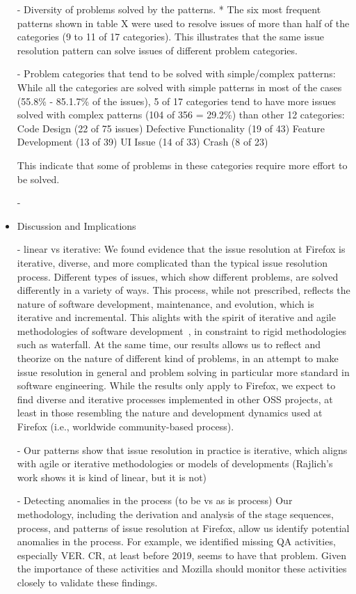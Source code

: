 \begin{itemize}
		- Diversity of problems solved by the patterns.
		  * The six most frequent patterns shown in table X were used to resolve issues of more than half of the categories  (9 to 11 of 17 categories). This illustrates that the same issue resolution pattern can solve issues of different problem categories. 
		
		- Problem categories that tend to be solved with simple/complex patterns:
		While all the categories are solved with simple patterns in most of the cases (55.8\% -  85.1.7\% of the issues), 5 of 17 categories tend to have more issues solved with complex patterns (104 of 356 = 29.2\%) than other 12 categories: 
		Code Design (22 of 75 issues)
		Defective Functionality (19 of 43)
		Feature Development (13 of 39)
		UI Issue (14 of 33)
		Crash (8 of 23)
		
		This indicate that some of problems in these categories require more effort to be solved.
		
		- 
		
	\item Discussion and Implications
	
	- linear vs iterative: 
			We found evidence that the issue resolution at Firefox is iterative, diverse, and more complicated than the typical issue resolution process. Different types of issues, which show different problems, are solved differently in a variety of ways. This process, while not prescribed, reflects the nature of software development, maintenance, and evolution, which is iterative and incremental. This alights with the spirit of iterative and agile methodologies of software development~\re, in constraint to rigid methodologies such as waterfall. At the same time, our results allows us to reflect and theorize on the nature of different kind of problems, in an attempt to make issue resolution in general and problem solving in particular more standard in software engineering. While the results only apply to Firefox, we expect to find diverse and iterative processes implemented in other OSS projects, at least in those resembling the nature and development dynamics used at Firefox (i.e., worldwide community-based process).
			
			- Our patterns show that issue resolution  in practice is iterative, which aligns with agile or iterative methodologies or models of developments (Rajlich's work shows it is kind of linear, but it is not)
			
	- Detecting anomalies in the process (to be vs as is process)
		  Our methodology, including the derivation and analysis of the stage sequences, process, and patterns of issue resolution at Firefox, allow us identify potential anomalies in the process. For example, we identified missing QA activities, especially VER. CR, at least before 2019, seems to have that problem. Given the importance of these activities and Mozilla should monitor these activities closely to validate these findings.
		  

\end{itemize}

